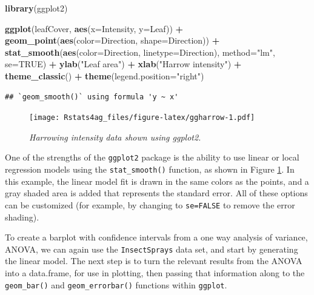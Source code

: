 \documentclass[letterpaper,]{book}
\newenvironment{Shaded}{\begin{snugshade}}{\end{snugshade}}
\newcommand{\DataTypeTok}[1]{\textcolor[rgb]{0.13,0.29,0.53}{#1}}
\newcommand{\KeywordTok}[1]{\textcolor[rgb]{0.13,0.29,0.53}{\textbf{#1}}}
\newcommand{\NormalTok}[1]{#1}
\newcommand{\OperatorTok}[1]{\textcolor[rgb]{0.81,0.36,0.00}{\textbf{#1}}}
\newcommand{\OtherTok}[1]{\textcolor[rgb]{0.56,0.35,0.01}{#1}}
\newcommand{\StringTok}[1]{\textcolor[rgb]{0.31,0.60,0.02}{#1}}
\begin{document}
\begin{Shaded}
\begin{Highlighting}[]
\KeywordTok{library}\NormalTok{(ggplot2)}

\KeywordTok{ggplot}\NormalTok{(leafCover, }\KeywordTok{aes}\NormalTok{(}\DataTypeTok{x=}\NormalTok{Intensity, }\DataTypeTok{y=}\NormalTok{Leaf)) }\OperatorTok{+}
\StringTok{  }\KeywordTok{geom_point}\NormalTok{(}\KeywordTok{aes}\NormalTok{(}\DataTypeTok{color=}\NormalTok{Direction, }\DataTypeTok{shape=}\NormalTok{Direction)) }\OperatorTok{+}
\StringTok{  }\KeywordTok{stat_smooth}\NormalTok{(}\KeywordTok{aes}\NormalTok{(}\DataTypeTok{color=}\NormalTok{Direction, }\DataTypeTok{linetype=}\NormalTok{Direction), }\DataTypeTok{method=}\StringTok{"lm"}\NormalTok{, }\DataTypeTok{se=}\OtherTok{TRUE}\NormalTok{) }\OperatorTok{+}
\StringTok{  }\KeywordTok{ylab}\NormalTok{(}\StringTok{"Leaf area"}\NormalTok{) }\OperatorTok{+}\StringTok{ }\KeywordTok{xlab}\NormalTok{(}\StringTok{"Harrow intensity"}\NormalTok{) }\OperatorTok{+}
\StringTok{  }\KeywordTok{theme_classic}\NormalTok{() }\OperatorTok{+}\StringTok{ }\KeywordTok{theme}\NormalTok{(}\DataTypeTok{legend.position=}\StringTok{"right"}\NormalTok{) }
\end{Highlighting}
\end{Shaded}

\begin{verbatim}
## `geom_smooth()` using formula 'y ~ x'
\end{verbatim}

\begin{figure}
\centering
\texttt{[image: Rstats4ag\_files/figure-latex/ggharrow-1.pdf]}
\caption{\label{fig:ggharrow}\emph{Harrowing intensity data shown using ggplot2.}}
\end{figure}

One of the strengths of the \texttt{ggplot2} package is the ability to use linear or local regression models using the \texttt{stat\_smooth()} function, as shown in Figure \ref{fig:ggharrow}. In this example, the linear model fit is drawn in the same colors as the points, and a gray shaded area is added that represents the standard error. All of these options can be customized (for example, by changing to \texttt{se=FALSE} to remove the error shading).

To create a barplot with confidence intervals from a one way analysis of variance, ANOVA, we can again use the \texttt{InsectSprays} data set, and start by generating the linear model. The next step is to turn the relevant results from the ANOVA into a data.frame, for use in plotting, then passing that information along to the \texttt{geom\_bar()} and \texttt{geom\_errorbar()} functions within \texttt{ggplot}.
\end{document}
